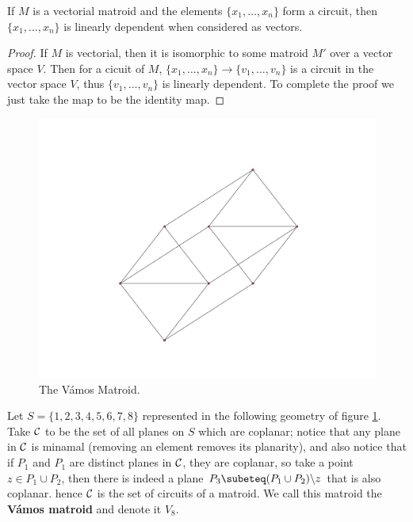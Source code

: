 \begin{proposition}\label{1.2.3}
    If $M$ is a vectorial matroid and the elements $\{x_1, \dots ,x_n\}$ form a circuit, then
    $\{x_1, \dots ,x_n\}$ is linearly dependent when considered as vectors. 
\end{proposition}
\begin{proof}
    If $M$ is vectorial, then it is isomorphic to some matroid  $M'$ over a vector space  $V$. Then
    for a cicuit of  $M$,  $\{x_1, \dots ,x_n\} \rightarrow \{v_1, \dots ,v_n\}$ is a circuit in the
    vector space $V$, thus  $\{v_1, \dots, v_n\}$ is linearly dependent. To complete the proof we
    just take the map to be the identity map.
\end{proof}

\begin{example}
    \begin{figure}
        \centering
        \includegraphics[scale = 0.4]{Figures/Chapter1/vamosmatroid.png}
        \caption{The Vámos Matroid.}
        \label{fig:1.1}
    \end{figure}

    Let $S=\{1,2,3,4,5,6,7,8\}$ represented in the following geometry of figure \ref{fig:1.1}. Take
    $\mathcal{C}$ to be the set of all planes on  $S$ which are coplanar; notice that any plane in $\mathcal{C}$ is
    minamal  (removing an element removes its planarity), and also notice that if $P_1$ and $ P_1$
    are distinct planes in $\mathcal{C}$, they are coplanar, so take a point $z \in P_1 \cup P_2$, then
    there is indeed a plane $ P_3 \subeteq \com{(P_1 \cup P_2)}{z}$ that is also coplanar. hence
    $\mathcal{C}$ is the set of circuits of a matroid. We call this matroid the \textbf{Vámos matroid} and
    denote it $V_8$.
\end{example} 

